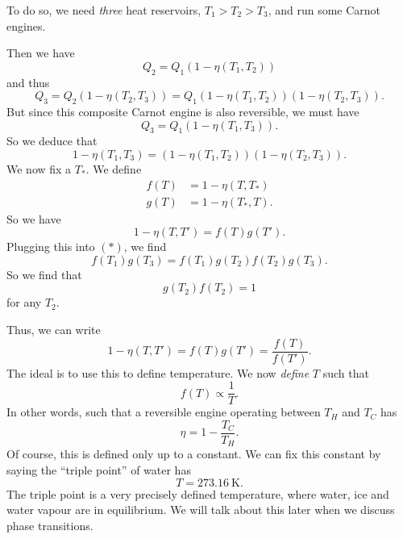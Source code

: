 \documentclass[a4paper]{article}
\begin{document}
To do so, we need \emph{three} heat reservoirs, $T_1 > T_2 > T_3$, and run some Carnot engines.
\begin{center}
\end{center}
Then we have
\[
  Q_2 = Q_1 (1 - \eta(T_1, T_2))
\]
and thus
\[
  Q_3 = Q_2( 1 - \eta(T_2, T_3)) = Q_1(1 - \eta(T_1, T_2))(1 - \eta(T_2, T_3)).
\]
But since this composite Carnot engine is also reversible, we must have
\[
  Q_3 = Q_1(1 - \eta(T_1, T_3)).
\]
So we deduce that
\[
  1 - \eta(T_1, T_3) = (1 - \eta(T_1, T_2))( 1 - \eta(T_2, T_3)).\tag{$*$}
\]
We now fix a $T_*$. We define
\begin{align*}
  f(T) &= 1 - \eta(T, T_*)\\
  g(T) &= 1 - \eta(T_*, T).
\end{align*}
So we have
\[
  1 - \eta(T, T') = f(T) g(T').
\]
Plugging this into $(*)$, we find
\[
  f(T_1) g(T_3) = f(T_1) g(T_2) f(T_2) g(T_3).
\]
So we find that
\[
  g(T_2) f(T_2) = 1
\]
for any $T_2$.

Thus, we can write
\[
  1 - \eta(T, T') = f(T) g(T') = \frac{f(T)}{f(T')}.
\]
The ideal is to use this to define temperature. We now \emph{define} $T$ such that
\[
  f(T) \propto \frac{1}{T}.
\]
In other words, such that a reversible engine operating between $T_H$ and $T_C$ has
\[
  \eta = 1 - \frac{T_C}{T_H}.
\]
Of course, this is defined only up to a constant. We can fix this constant by saying the ``triple point'' of water has
\[
  T = \SI{273.16}{\kelvin}.
\]
The triple point is a very precisely defined temperature, where water, ice and water vapour are in equilibrium. We will talk about this later when we discuss phase transitions.
\end{document}
